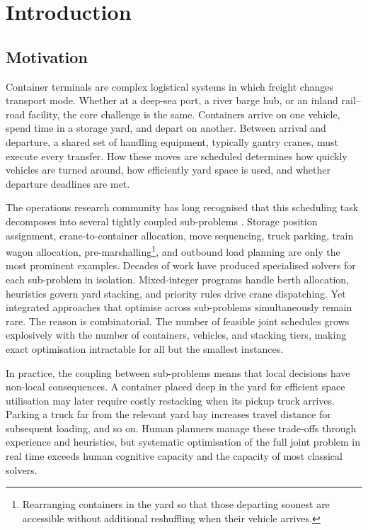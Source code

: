 \chapter{Introduction}
\label{ch:introduction}

\section{Motivation}
\label{sec:intro:motivation}

Container terminals are complex logistical systems in which freight changes transport mode. Whether at a deep-sea port, a river barge hub, or an inland rail--road facility, the core challenge is the same. Containers arrive on one vehicle, spend time in a storage yard, and depart on another. Between arrival and departure, a shared set of handling equipment, typically gantry cranes, must execute every transfer. How these moves are scheduled determines how quickly vehicles are turned around, how efficiently yard space is used, and whether departure deadlines are met.

The operations research community has long recognised that this scheduling task decomposes into several tightly coupled sub-problems \cite{stahlbock2008operations,vis2003transshipment,boysen2013container}. Storage position assignment, crane-to-container allocation, move sequencing, truck parking, train wagon allocation, pre-marshalling\footnote{Rearranging containers in the yard so that those departing soonest are accessible without additional reshuffling when their vehicle arrives.}, and outbound load planning are only the most prominent examples. Decades of work have produced specialised solvers for each sub-problem in isolation. Mixed-integer programs handle berth allocation, heuristics govern yard stacking, and priority rules drive crane dispatching. Yet integrated approaches that optimise across sub-problems simultaneously remain rare. The reason is combinatorial. The number of feasible joint schedules grows explosively with the number of containers, vehicles, and stacking tiers, making exact optimisation intractable for all but the smallest instances.

In practice, the coupling between sub-problems means that local decisions have non-local consequences. A container placed deep in the yard for efficient space utilisation may later require costly restacking when its pickup truck arrives. Parking a truck far from the relevant yard bay increases travel distance for subsequent loading, and so on. Human planners manage these trade-offs through experience and heuristics, but systematic optimisation of the full joint problem in real time exceeds human cognitive capacity and the capacity of most classical solvers.

